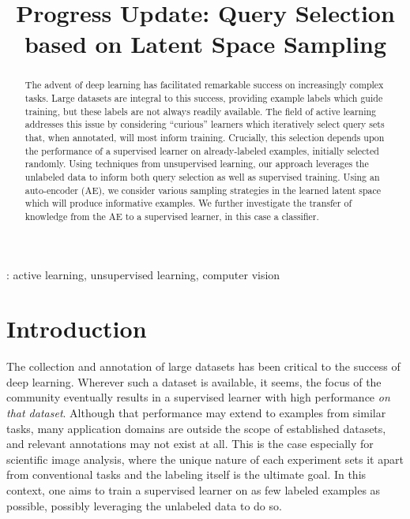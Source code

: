 \documentclass[a4paper]{article}
\title{Progress Update: Query Selection based on Latent Space Sampling}
\begin{document}
\maketitle

\begin{abstract}
  The advent of deep learning has facilitated remarkable success on increasingly
  complex tasks. Large datasets are integral to this success, providing example
  labels which guide training, but these labels are not always readily
  available. The field of active learning addresses this issue by considering
  ``curious'' learners which iteratively select query sets that, when annotated,
  will most inform training. Crucially, this selection depends upon the
  performance of a supervised learner on already-labeled examples, initially
  selected randomly. Using techniques from unsupervised learning, our approach
  leverages the unlabeled data to inform both query selection as well as
  supervised training. Using an auto-encoder (AE), we consider various sampling
  strategies in the learned latent space which will produce informative
  examples. We further investigate the transfer of knowledge from the AE to a
  supervised learner, in this case a classifier.
\end{abstract}
: active learning, unsupervised learning, computer
vision

\section{Introduction}
\label{sec:introduction}

The collection and annotation of large datasets has been critical to the success
of deep learning. Wherever such a dataset is available, it seems, the focus of
the community eventually results in a supervised learner with high performance
\emph{on that dataset}. Although that performance may extend to examples from
similar tasks, many application domains are outside the scope of established
datasets, and relevant annotations may not exist at all. This is the case
especially for scientific image analysis, where the unique nature of each
experiment sets it apart from conventional tasks and the labeling itself is the
ultimate goal. In this context, one aims to train a supervised learner on as few
labeled examples as possible, possibly leveraging the unlabeled data to do so.

\end{document}
